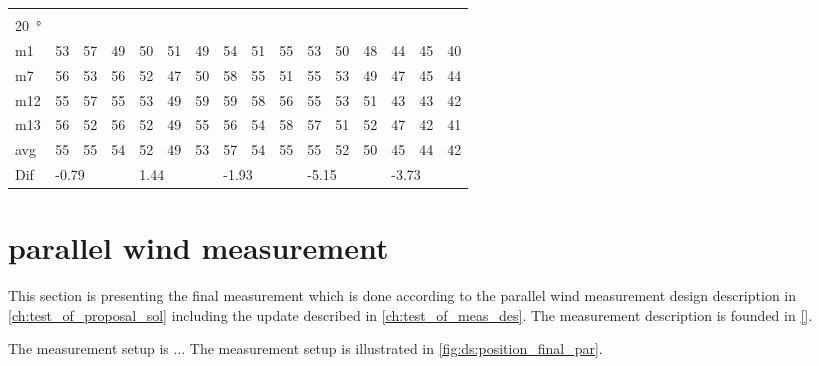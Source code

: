 \begin{table}[H]
\begin{tabular}{l|l|l|l|l|l|l|l|l|l|l|l|l|lll}
 \multicolumn{16}{l}{ } \\                             
\SI{20}{\degree}   & \multicolumn{3}{l|}{} & \multicolumn{3}{l|}{} & \multicolumn{3}{l|}{} & \multicolumn{3}{l|}{} & \multicolumn{3}{l}{}   \\  \hline
m1    &53      &  57    &  49    &   50   &  51    &  49    &  54    &   51    &  55    &    53   &  50    &  48    & \multicolumn{1}{l|}{44} & \multicolumn{1}{l|}{45} &40  \\
m7    & 56     &  53    &  56    &   52   &  47    &   50   &   58   &   55    &  51    &    55   & 53     &  49    & \multicolumn{1}{l|}{47} & \multicolumn{1}{l|}{45} &44  \\
m12  & 55     &  57    &  55    &  53    &  49    &   59   &   59   &   58    &   56   &   55    &  53    & 51     & \multicolumn{1}{l|}{43} & \multicolumn{1}{l|}{43} & 42 \\
m13  &  56    &  52    &  56    &  52    &  49    &   55   &   56   &   54    &  58    &   57    &  51    &  52    & \multicolumn{1}{l|}{47} & \multicolumn{1}{l|}{42} & 41 \\ \hline
avg &  55    & 55     &   54   &  52    & 49     &  53    &  57    &  54     &  55    &  55     &   52   & 50     & \multicolumn{1}{l|}{45} & \multicolumn{1}{l|}{44}  &42  \\ \hline  
Dif & \multicolumn{3}{l|}{-0.79} & \multicolumn{3}{l|}{1.44} & \multicolumn{3}{l|}{-1.93} & \multicolumn{3}{l|}{-5.15} & \multicolumn{3}{l}{-3.73}                              
\end{tabular}
\end{table}

\section{parallel wind measurement}\label{mes:kudo:par_mes}
This section is presenting the final measurement which is done according to the parallel wind measurement design description in \autoref{ch:test_of_proposal_sol} including the update described in \autoref{ch:test_of_meas_des}. The measurement description is founded in \autoref{}. 


The measurement setup is ... The measurement setup is illustrated in \autoref{fig:ds:position_final_par}.






